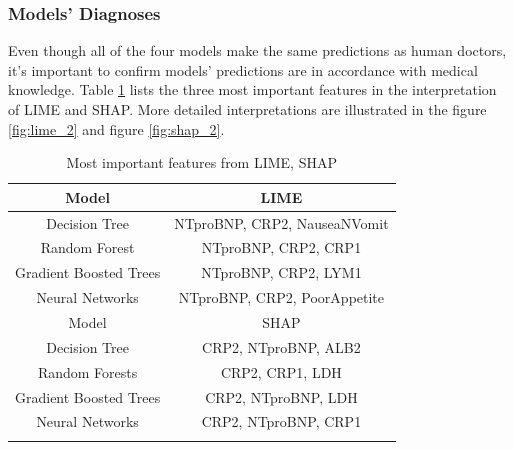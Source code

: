 \subsubsection{Models' Diagnoses}

Even though all of the four models make the same predictions as human doctors, it's important to confirm models' predictions are in accordance with medical knowledge. Table \ref{tab:important_feature_patient} lists the three most important features in the interpretation of LIME and SHAP. More detailed interpretations are illustrated in the figure \ref{fig:lime_2} and figure \ref{fig:shap_2}.

\begin{table}[H]
\centering
\caption{Most important features from LIME, SHAP}
\begin{tabular}{@{}cc@{}}
\toprule
Model                   & LIME                          \\  
\toprule
Decision Tree           & NTproBNP, CRP2, NauseaNVomit  \\
Random Forest           & NTproBNP, CRP2, CRP1          \\  
Gradient Boosted Trees  & NTproBNP, CRP2, LYM1          \\  
Neural Networks         & NTproBNP, CRP2, PoorAppetite  \\
\toprule
Model                   & SHAP  \\ 
\toprule
Decision Tree           & CRP2, NTproBNP, ALB2 \\
Random Forests          & CRP2, CRP1, LDH      \\
Gradient Boosted Trees  & CRP2, NTproBNP, LDH  \\
Neural Networks         & CRP2, NTproBNP, CRP1 \\  
\bottomrule
\label{tab:important_feature_patient}
\end{tabular}
\end{table}




